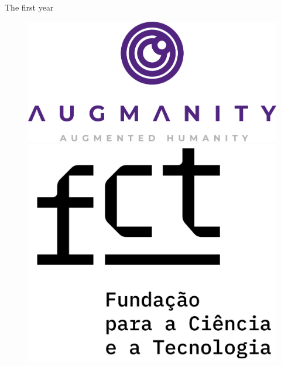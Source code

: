 \begin{frame}{The first year}
    \begin{figure}
        \begin{minipage}[t]{0.30\linewidth}
            \centering
            \vspace{0pt}
            \includegraphics[width=\textwidth]{img/student_grant.png}
        \end{minipage}
        \hspace{0.5cm}
        \begin{minipage}[t]{0.50\linewidth}
            \centering
            \vspace{4pt}
            \includegraphics[width=\textwidth]{img/fct.jpg}
        \end{minipage}
    \end{figure}
\end{frame}